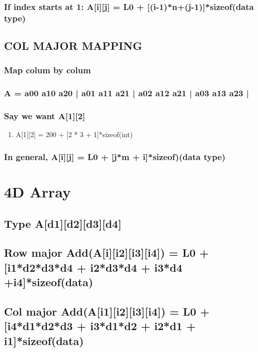 \documentclass{article}
\begin{document}
\subsubsection{If index starts at 1:  A[i][j] = L0 + [(i-1)*n+(j-1)]*sizeof(data type)}
\label{sec:org0433bfd}
\subsection{COL MAJOR MAPPING}
\label{sec:org6c4eb09}
\subsubsection{Map colum by colum}
\label{sec:org450e3ed}
\subsubsection{A = a00 a10 a20 | a01 a11 a21 | a02 a12 a21 | a03 a13 a23 |}
\label{sec:org7514853}
\subsubsection{Say we want A[1][2]}
\label{sec:orgb6baf00}
\begin{enumerate}
\item A[1][2] = 200 + [2 * 3 + 1]*sizeof(int)
\label{sec:orgd672be3}
\end{enumerate}
\subsubsection{In general, \textbf{A[i][j] = L0 + [j*m + i]*sizeof)(data type)}}
\label{sec:org3ffc12b}
\section{4D Array}
\label{sec:org2a9a788}
\subsection{Type A[d1][d2][d3][d4]}
\label{sec:orgd454744}
\subsection{Row major Add(A[i][i2][i3][i4]) = L0 + [i1*d2*d3*d4 + i2*d3*d4 + i3*d4 +i4]*sizeof(data)}
\label{sec:org3e3d4fc}
\subsection{Col major Add(A[i1][i2][i3][i4]) = L0 + [i4*d1*d2*d3 + i3*d1*d2 + i2*d1 + i1]*sizeof(data)}
\label{sec:org3a362d6}
\end{document}
